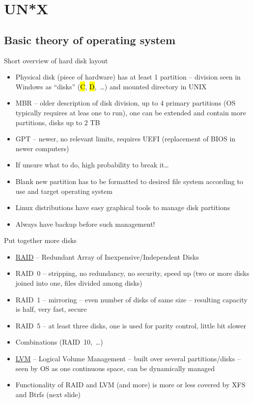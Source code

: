 \documentclass[compress, ucs, xelatex, 11pt, xcolor=svgnames,
  hyperref={
    bookmarks=true,
    unicode=true,
    colorlinks=true,
    pdftitle={Linux, command line and MetaCentrum},
    plainpages=false,
    pdfauthor={Vojtech Zeisek},
    pdfsubject={Course about use of Linux command line, writing shell scripts and using MetaCentrum of CESNET},
    pdfcreator={XeLaTeX},
    pdfkeywords={Linux, GNU, BASH, shell, command line, MetaCentrum},
    linkcolor=Red,
    anchorcolor=Blue,
    citecolor=Purple,
    filecolor=DodgerBlue,
    menucolor=DarkOrchid,
    urlcolor=DeepSkyBlue,
    pdftex},
  url={hyphens, lowtilde} %
  ]{beamer}
\renewcommand{\texttt}[1]{\hl{\ttfamily #1}}
\begin{document}
\section{UN*X}

\subsection{Basic theory of operating system}

\begin{frame}{Short overview of hard disk layout}
\begin{itemize}
  \item Physical disk (piece of hardware) has at least 1 partition -- division seen in Windows as ``disks'' (\texttt{C}, \texttt{D},~\ldots) and mounted directory in UNIX
  \item MBR -- older description of disk division, up to 4 primary partitions (OS typically requires at leas one to run), one can be extended and contain more partitions, disks up to 2 TB
  \item GPT -- newer, no relevant limits, requires UEFI (replacement of BIOS in newer computers)
  \item If unsure what to do, high probability to break it\ldots
  \item Blank new partition has to be formatted to desired file system according to use and target operating system
  \item Linux distributions have easy graphical tools to manage disk partitions
  \item Always have backup before such management!
\end{itemize}
\end{frame}

\begin{frame}{Put together more disks}
\begin{itemize}
  \item \href{https://en.wikipedia.org/wiki/RAID}{RAID} -- Redundant Array of Inexpensive/Independent Disks
  \item RAID~0 -- stripping, no redundancy, no security, speed up (two or more disks joined into one, files divided among disks)
  \item RAID~1 -- mirroring -- even number of disks of same size -- resulting capacity is half, very fast, secure
  \item RAID~5 -- at least three disks, one is used for parity control, little bit slower
  \item Combinations (RAID~10,~\ldots)
  \item \href{https://en.wikipedia.org/wiki/Logical_volume_management}{LVM} -- Logical Volume Management -- built over several partitions/disks -- seen by OS as one continuous space, can be dynamically managed
  \item Functionality of RAID and LVM (and more) is more or less covered by XFS and Btrfs (next slide)
\end{itemize}
\end{frame}
\end{document}
